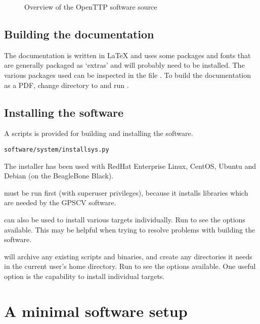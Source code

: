 \begin{figure}
\caption{Overview of the OpenTTP software source}
\end{figure}

\subsection{Building the documentation}

The documentation is written in LaTeX and uses some packages and fonts that are generally packaged as `extras'
and will probably need to be installed. The various packages used can be inspected in the file
.
To build the documentation as a PDF, change directory to  and run .

\subsection{Installing the software}

A scripts is provided for building and installing the software.
\begin{lstlisting}
software/system/installsys.py
\end{lstlisting}

The installer has been used with RedHat Enterprise Linux, 
CentOS, Ubuntu and Debian (on the BeagleBone Black).

 must be run first (with superuser privileges), 
because it installs libraries which are needed by the GPSCV software.

 can also be used to install various targets individually.
Run  to see the options available. 
This may be helpful when trying to resolve problems with building the software.

 will archive any existing scripts and binaries, and create any
directories it needs in the current user's home directory. 
Run  to see the options available.
One useful option is the capability to install individual targets.

\section{A minimal software setup}

